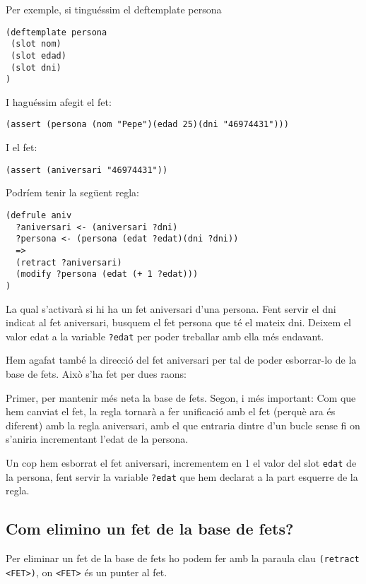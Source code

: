 \documentclass[11pt,svgnames]{scrbook}
\begin{document}
Per exemple, si tinguéssim el deftemplate persona

\begin{verbatim}
(deftemplate persona
 (slot nom)
 (slot edad)
 (slot dni)
) \end{verbatim}

I haguéssim afegit el fet:

\begin{verbatim}
(assert (persona (nom "Pepe")(edad 25)(dni "46974431")))\end{verbatim}

I el fet:

\begin{verbatim}
(assert (aniversari "46974431"))
\end{verbatim}

Podríem tenir la següent regla:

\begin{verbatim}
(defrule aniv
  ?aniversari <- (aniversari ?dni)
  ?persona <- (persona (edat ?edat)(dni ?dni))
  =>
  (retract ?aniversari)
  (modify ?persona (edat (+ 1 ?edat)))
)
\end{verbatim}

La qual s'activarà si hi ha un fet aniversari d'una persona. Fent servir el dni indicat al fet
aniversari, busquem el fet persona que té el mateix dni. Deixem el valor edat a la variable
\texttt{?edat} per poder treballar amb ella més endavant.

Hem agafat també la direcció del fet aniversari per tal de poder esborrar-lo de la base de fets. Això s'ha fet per dues raons:

Primer, per mantenir més neta la base de fets.
Segon, i més important: Com que hem canviat el fet, la regla tornarà a fer unificació amb el fet
(perquè ara és diferent) amb la regla aniversari, amb el que entraria dintre d'un bucle sense fi on
s'aniria incrementant l'edat de la persona.

Un cop hem esborrat el fet aniversari, incrementem en 1 el valor del slot \texttt{edat} de  la
persona, fent servir la variable \texttt{?edat} que hem declarat a la part esquerre de la regla.

\subsection{Com elimino un fet de la base de fets?}


Per eliminar un fet de la base de fets ho podem fer amb la paraula clau
\texttt{(retract
<FET>)}, on \texttt{<FET>} és un punter al fet.
\end{document}

